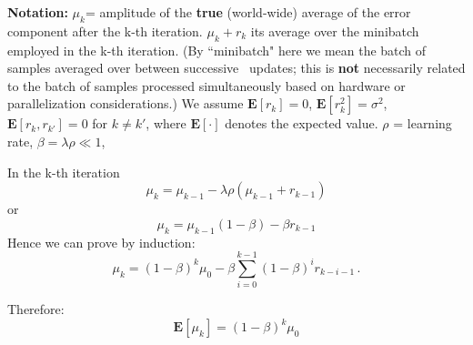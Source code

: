 \documentclass{article} %
\begin{document}
\textbf{Notation:} $\mu_k$= amplitude of the \textbf{true} (world-wide) average of the error component after the k-th iteration. $\mu_k + r_k$ its average over the minibatch employed in the k-th iteration. (By ``minibatch" here we mean the batch of samples averaged over between successive \SGD~updates; this is \textbf{not} necessarily related to the batch of samples processed simultaneously based on hardware or parallelization considerations.) We assume $\mathbf{E}[r_k]=0$, $\mathbf{E}[r_k^2]=\sigma^2$, $\mathbf{E}[r_k,r_{k'}]=0$ for $k \neq k'$, where $\mathbf E[\cdot]$ denotes the expected value.
$\rho$ = learning rate, $\beta=\lambda \rho \ll 1$, 

In the k-th iteration 
\begin{equation}
\mu_k = \mu_{k-1} - \lambda \rho (\mu_{k-1} + r_{k-1})
\label{eqn:muupdate}
\end{equation}
or
\begin{equation}
	\mu_k = \mu_{k-1} (1- \beta)  - \beta r_{k-1}
	\label{eqn:muupdate2}
\end{equation}
Hence we can prove by induction:
\begin{equation}
  \mu_k = (1-\beta)^k \mu_0 - \beta \sum_{i=0}^{k-1} (1-\beta)^i r_{k-i-1}\,.
\end{equation}

Therefore:
\begin{equation}
\mathbf E [\mu_k] = (1-\beta)^k \mu_0 
\end{equation}
\end{document}
